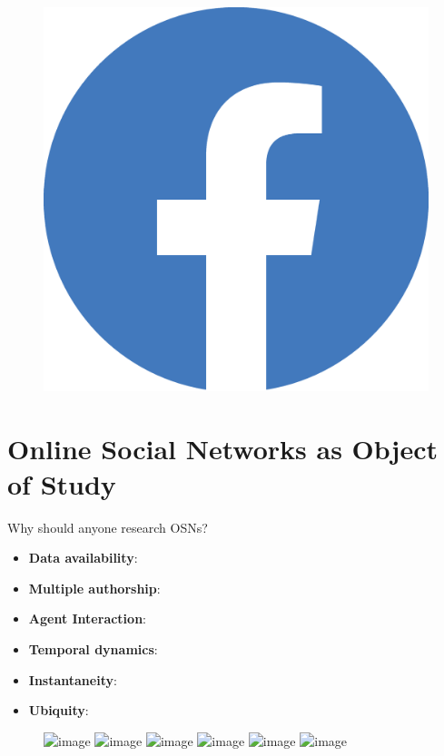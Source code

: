 \documentclass[8pt]{beamer}
\begin{document}
\begin{frame}
\begin{figure}
\begin{minipage}{0.25\textwidth}
  		\end{minipage}
  		\begin{minipage}{0.25\textwidth}
  			\includegraphics[scale=0.035]{asset/facebook-logo.eps}
  		\end{minipage}
  	\end{figure}
  \end{frame}

  \section{Online Social Networks as Object of Study}

  \begin{frame}{Why should anyone research OSNs?}
    \begin{itemize}
      \item<1->[] \textbf{Data availability}:
      \item<2->[] \textbf{Multiple authorship}:
      \item<3->[] \textbf{Agent Interaction}:
      \item<4->[] \textbf{Temporal dynamics}:
      \item<5->[] \textbf{Instantaneity}:
      \item<6->[] \textbf{Ubiquity}:
    \end{itemize}
    
    \begin{figure}
    	\includegraphics<1>[scale=0.2]{asset/database.png}
    	\includegraphics<2>[scale=0.2]{asset/conversation.png}
    	\includegraphics<3>[scale=0.2]{asset/call-center-agent.png}
    	\includegraphics<4>[scale=0.2]{asset/exchange-rate.png}
    	\includegraphics<5>[scale=0.2]{asset/trending-topic.png}
    	\includegraphics<6>[scale=0.2]{asset/network.png}
    \end{figure}
    
  \end{frame}
\end{document}
